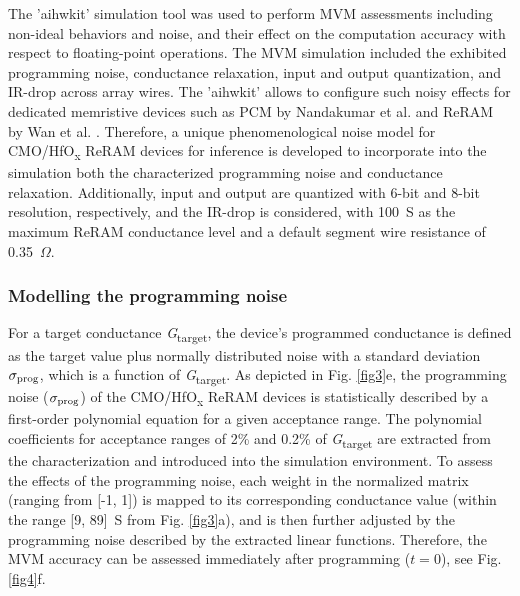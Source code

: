 The 'aihwkit' \cite{Rasch2021AFlexible} simulation tool was used to perform MVM assessments including non-ideal behaviors and noise, and their effect on the computation accuracy with respect to floating-point operations. The MVM simulation included the exhibited programming noise, conductance relaxation, input and output quantization, and IR-drop across array wires.
The 'aihwkit' allows to configure such noisy effects for dedicated memristive devices such as PCM by Nandakumar et al. \cite{Nandakumar2019PhaseChange} and ReRAM by Wan et al. \cite{Wan2022}. Therefore, a unique phenomenological noise model for CMO/HfO\textsubscript{\textnormal{x}} ReRAM devices for inference is developed to incorporate into the simulation both the characterized programming noise and conductance relaxation. Additionally, input and output are quantized with 6-bit and 8-bit resolution, respectively, and the IR-drop is considered, with 100~\textmu S as the maximum ReRAM conductance level and a default segment wire resistance of 0.35~$\Omega$. 
\subsubsection{Modelling the programming noise}
For a target conductance  \textit{G}\textsubscript{\textnormal{target}}, the device's programmed conductance is defined as the target value plus normally distributed noise with a standard deviation $\sigma_{\rm prog}$, which is a function of \textit{G}\textsubscript{\textnormal{target}}. As depicted in Fig. \ref{fig3}e, the programming noise ($\sigma_{\rm prog}$) of the CMO/HfO\textsubscript{\textnormal{x}} ReRAM  devices is statistically described by a first-order polynomial equation for a given acceptance range. The polynomial coefficients for acceptance ranges of 2\% and 0.2\% of \textit{G}\textsubscript{\textnormal{target}} are extracted from the characterization and introduced into the simulation environment. To assess the effects of the programming noise, each weight in the normalized matrix (ranging from [-1, 1]) is mapped to its corresponding conductance value (within the range [9, 89]~\textmu S from Fig. \ref{fig3}a), and is then further adjusted by the programming noise described by the extracted linear functions. Therefore, the MVM accuracy can be assessed immediately after programming ($t=0$), see Fig. \ref{fig4}f.

